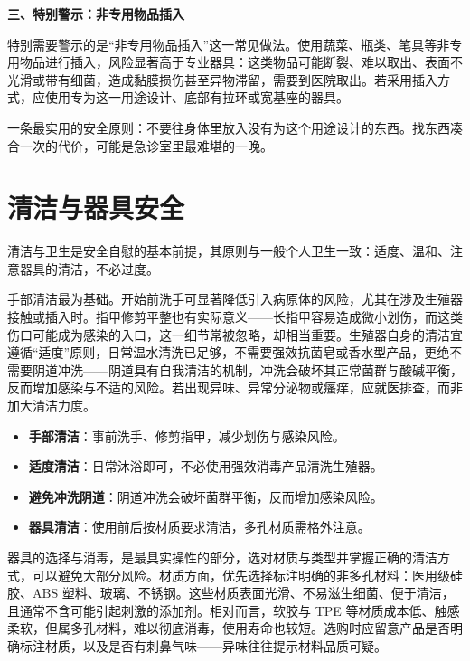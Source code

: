 \documentclass[12pt,UTF8]{ctexbook}
\begin{document}
\textbf{三、特别警示：非专用物品插入}

特别需要警示的是“非专用物品插入”这一常见做法。使用蔬菜、瓶类、笔具等非专用物品进行插入，风险显著高于专业器具：这类物品可能断裂、难以取出、表面不光滑或带有细菌，造成黏膜损伤甚至异物滞留，需要到医院取出。若采用插入方式，应使用专为这一用途设计、底部有拉环或宽基座的器具。

\begin{tcolorbox}[colback=pink!5!white,colframe=red!50!black,title=贴心小叮咛]
一条最实用的安全原则：不要往身体里放入没有为这个用途设计的东西。找东西凑合一次的代价，可能是急诊室里最难堪的一晚。
\end{tcolorbox}

\section{清洁与器具安全}

清洁与卫生是安全自慰的基本前提，其原则与一般个人卫生一致：适度、温和、注意器具的清洁，不必过度。

手部清洁最为基础。开始前洗手可显著降低引入病原体的风险，尤其在涉及生殖器接触或插入时。指甲修剪平整也有实际意义——长指甲容易造成微小划伤，而这类伤口可能成为感染的入口，这一细节常被忽略，却相当重要。生殖器自身的清洁宜遵循“适度”原则，日常温水清洗已足够，不需要强效抗菌皂或香水型产品，更绝不需要阴道冲洗——阴道具有自我清洁的机制，冲洗会破坏其正常菌群与酸碱平衡，反而增加感染与不适的风险。若出现异味、异常分泌物或瘙痒，应就医排查，而非加大清洁力度。

\begin{itemize}
\item \textbf{手部清洁}：事前洗手、修剪指甲，减少划伤与感染风险。
\item \textbf{适度清洁}：日常沐浴即可，不必使用强效消毒产品清洗生殖器。
\item \textbf{避免冲洗阴道}：阴道冲洗会破坏菌群平衡，反而增加感染风险。
\item \textbf{器具清洁}：使用前后按材质要求清洁，多孔材质需格外注意。
\end{itemize}

器具的选择与消毒，是最具实操性的部分，选对材质与类型并掌握正确的清洁方式，可以避免大部分风险。材质方面，优先选择标注明确的非多孔材料：医用级硅胶、ABS 塑料、玻璃、不锈钢。这些材质表面光滑、不易滋生细菌、便于清洁，且通常不含可能引起刺激的添加剂。相对而言，软胶与 TPE 等材质成本低、触感柔软，但属多孔材料，难以彻底消毒，使用寿命也较短。选购时应留意产品是否明确标注材质，以及是否有刺鼻气味——异味往往提示材料品质可疑。
\end{document}
